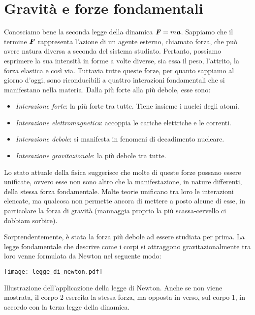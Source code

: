 \marginpar{\minitoc}

\section{Gravità e forze fondamentali}
Conosciamo bene la seconda legge della dinamica $\textbf{\textit{F}} = m\textbf{\textit{a}}$.
Sappiamo che il termine $\textbf{\textit{F}}$ rappresenta l'azione di un agente esterno,
chiamato forza, che può avere natura diversa a seconda del sistema studiato.
Pertanto, possiamo esprimere
la sua intensità in forme a volte diverse, sia essa il peso, l'attrito, la
forza elastica e così via. Tuttavia tutte queste forze, per quanto sappiamo al
giorno d'oggi, sono riconducibili a quattro interazioni fondamentali che si
manifestano nella materia. Dalla più forte alla più debole, esse
sono:
\begin{itemize}
    \item \textit{Interazione forte}: la più forte tra tutte. Tiene insieme i nuclei
    degli atomi.

    \item \textit{Interazione elettromagnetica}: accoppia le cariche elettriche e
    le correnti.

    \item \textit{Interazione debole}: si manifesta in fenomeni di decadimento nucleare.
    
    \item \textit{Interazione gravitazionale}: la più debole tra tutte.
\end{itemize}
Lo stato attuale della fisica suggerisce che molte di queste forze possano essere
unificate, ovvero esse non sono altro che la manifestazione, in nature differenti,
della stessa forza fondamentale. Molte teorie unificano tra loro le interazioni
elencate, ma qualcosa non permette ancora di mettere a posto alcune di esse,
in particolare la forza di gravità (mannaggia proprio la più scassa-cervello ci
dobbiam sorbire).

Sorprendentemente, è stata la forza più debole ad essere studiata per prima.
La legge fondamentale che descrive come i corpi si attraggono gravitazionalmente tra
loro venne formulata da Newton nel seguente modo:

\begin{marginfigure}
    \centering
    \texttt{[image: legge\_di\_newton.pdf]}
    \caption{Illustrazione dell'applicazione della legge di Newton.
    Anche se non viene mostrata, il corpo 2 esercita la stessa
    forza, ma opposta in verso, sul corpo 1, in accordo con la
    terza legge della dinamica.}
    \label{gravitescionalfors}
\end{marginfigure}

